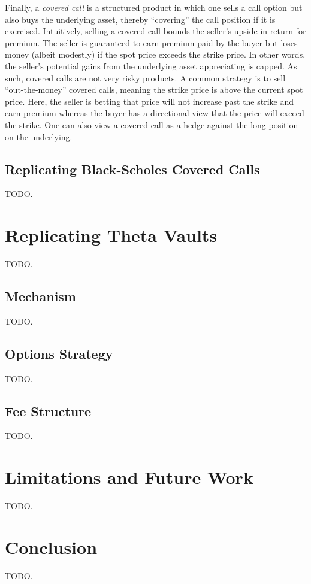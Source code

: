 \documentclass[hidelinks, 12pt]{article}
\begin{document}
Finally, a \textit{covered call} is a structured product in which one sells a call option but also buys the underlying asset, thereby ``covering'' the call position if it is exercised. Intuitively, selling a covered call bounds the seller's upside in return for premium. The seller is guaranteed to earn premium paid by the buyer but loses money (albeit modestly) if the spot price exceeds the strike price. In other words, the seller's potential gains from the underlying asset appreciating is capped. As such, covered calls are not very risky products. A common strategy is to sell ``out-the-money'' covered calls, meaning the strike price is above the current spot price. Here, the seller is betting that price will not increase past the strike and earn premium whereas the buyer has a directional view that the price will exceed the strike. One can also view a covered call as a hedge against the long position on the underlying.

\subsection{Replicating Black-Scholes Covered Calls}
\label{sec:coveredcall}

TODO.

\section{Replicating Theta Vaults}

TODO.

\subsection{Mechanism}

TODO.

\subsection{Options Strategy}

TODO.

\subsection{Fee Structure}

TODO.


\section{Limitations and Future Work}

TODO.

\section{Conclusion}

TODO.



\end{document}
